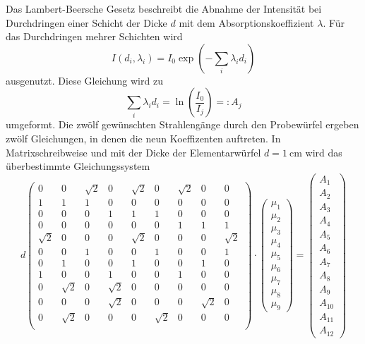 Das Lambert-Beersche Gesetz beschreibt die Abnahme der Intensität bei Durchdringen
einer Schicht der Dicke $d$ mit dem Absorptionskoeffizient $\lambda$. Für das Durchdringen
mehrer Schichten wird
\begin{equation}
  I(d_i,\lambda_i) = I_0 \exp\left(-\sum_i \lambda_i d_i\right)
\end{equation}
ausgenutzt.
Diese Gleichung wird zu
\begin{equation}
  \sum_i \lambda_i d_i = \ln\left(\frac{I_0}{I_j}\right) =: A_j
\end{equation}
umgeformt.
Die zwölf gewünschten Strahlengänge durch den Probewürfel ergeben zwölf Gleichungen,
in denen die neun Koeffizenten auftreten.
In Matrixschreibweise und mit der Dicke der Elementarwürfel $d=\SI{1}{\centi\meter}$ wird
das überbestimmte Gleichungssystem
\begin{equation}
  d
  \begin{pmatrix}
    0&0&\sqrt{2}&0&\sqrt{2}&0&\sqrt{2}&0&0\\
    1&1&1&0&0&0&0&0&0\\
    0&0&0&1&1&1&0&0&0\\
    0&0&0&0&0&0&1&1&1\\
    \sqrt{2}&0&0&0&\sqrt{2}&0&0&0&\sqrt{2}\\
    0&0&1&0&0&1&0&0&1\\
    0&1&0&0&1&0&0&1&0\\
    1&0&0&1&0&0&1&0&0\\
    0&\sqrt{2}&0&\sqrt{2}&0&0&0&0&0\\
    0&0&0&\sqrt{2}&0&0&0&\sqrt{2}&0\\
    0&\sqrt{2}&0&0&0&\sqrt{2}&0&0&0\\
  \end{pmatrix}
  \cdot
  \begin{pmatrix}
    \mu_1\\
    \mu_2\\
    \mu_3\\
    \mu_4\\
    \mu_5\\
    \mu_6\\
    \mu_7\\
    \mu_8\\
    \mu_9
  \end{pmatrix}
  =
  \begin{pmatrix}
    A_1\\
    A_2\\
    A_3\\
    A_4\\
    A_5\\
    A_6\\
    A_7\\
    A_8\\
    A_9\\
    A_{10}\\
    A_{11}\\
    A_{12}
  \end{pmatrix}
  \label{eq:Matrix}
\end{equation}

